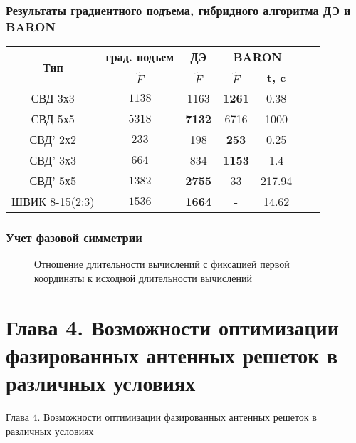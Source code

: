 \begin{frame}
    \frametitle{Результаты градиентного подъема, гибридного алгоритма ДЭ и BARON}
\begin{table}[!h]

\centering
\begin{tabular}{|c|c|c|cc|c c|}
    \hline
    \multirow{2}{*}{\textbf{Тип}} & \textbf{град. подъем} & \textbf{ДЭ} & \multicolumn{2}{|c|}{\textbf{BARON}} \\
    & \textbf{$\tilde{F}$} & \textbf{$\tilde{F}$} & \textbf{$\tilde{F}$} & \textbf{t, c}  \\
    \hline
    СВД 3х3        & ${1138}$ & 1163  & \textbf{1261}   & 0.38     \\
    СВД 5х5        & ${5318}$  & \textbf{7132}  & 6716   & 1000   \\
    СВД' 2х2       & ${233}$ & 198   & \textbf{253}    & 0.25         \\
    СВД' 3х3       & ${664}$ & 834   & \textbf{1153}   & 1.4          \\
    СВД' 5х5       & ${1382}$  & \textbf{2755}  & 33     & 217.94     \\
    ШВИК 8-15(2:3) & ${1536}$  & \textbf{1664}     & -   & 14.62     \\
    \hline
\end{tabular}
\label{tab:results_de}
\end{table}
\end{frame}

\begin{frame}
    \frametitle{Учет фазовой симметрии}
\begin{figure}
\caption{Отношение длительности вычислений с фиксацией первой координаты к исходной длительности вычислений}
\label{ris:ring}
\end{figure}
\end{frame}

\section{Глава 4. Возможности оптимизации фазированных антенных решеток в различных условиях}
\begin{frame}
    \begin{center}
        \Huge
        Глава 4. Возможности оптимизации фазированных антенных решеток в различных условиях
    \end{center}
\end{frame}


